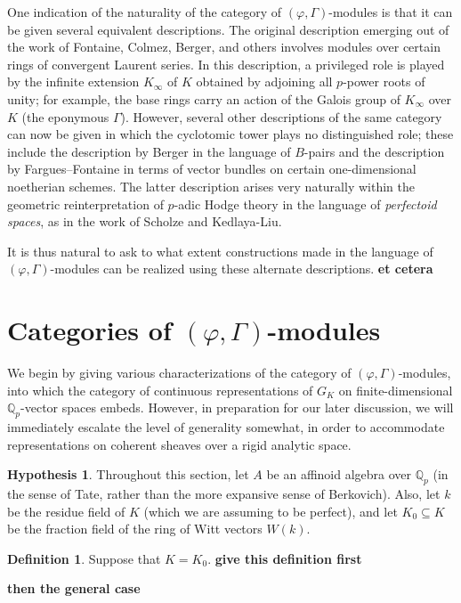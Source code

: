 \documentclass[12pt]{amsart}
\theoremstyle{definition}
\newtheorem{defn}[theorem]{Definition}
\newtheorem{hypothesis}[theorem]{Hypothesis}
\numberwithin{equation}{theorem}
\newcommand{\QQ}{\mathbb{Q}}
\begin{document}
One indication of the naturality of the category of $(\varphi, \Gamma)$-modules is that it can be given several equivalent descriptions. The original description emerging out of the work of Fontaine, Colmez, Berger, and others involves modules over certain rings of convergent Laurent series. In this description, a privileged role is played by the infinite extension $K_\infty$ of $K$ obtained by adjoining all $p$-power roots of unity; for example, the base rings carry an action of the Galois group of $K_\infty$ over $K$ (the eponymous $\Gamma$). However, several other descriptions of the same category can now be given in which the cyclotomic tower plays no distinguished role; these include the description by Berger in the language of $B$-pairs and the description by Fargues--Fontaine in terms of vector bundles on certain one-dimensional noetherian schemes. The latter description arises very naturally within the geometric reinterpretation of $p$-adic Hodge theory in the language of \emph{perfectoid spaces}, as in the work of Scholze and Kedlaya-Liu.

It is thus natural to ask to what extent constructions made in the language of $(\varphi, \Gamma)$-modules can be realized using these alternate descriptions. \textbf{et cetera}

\section{Categories of $(\varphi, \Gamma)$-modules}

We begin by giving various characterizations of the category of $(\varphi, \Gamma)$-modules,
into which the category of continuous representations of $G_K$ on finite-dimensional $\QQ_p$-vector spaces embeds. However, in preparation for our later discussion, we will immediately escalate the level of generality somewhat, in order to accommodate representations on coherent sheaves over a rigid analytic space.

\begin{hypothesis}
Throughout this section, let $A$ be an affinoid algebra over $\QQ_p$ (in the sense of Tate, rather than the more expansive sense of Berkovich).  Also, let $k$ be the residue field of $K$ (which we are assuming to be perfect), and let $K_0 \subseteq K$ be the fraction field of the ring of Witt vectors $W(k)$.
\end{hypothesis}

\begin{defn}
Suppose that $K = K_0$. \textbf{give this definition first}

\textbf{then the general case}

\end{defn}
\end{document}
